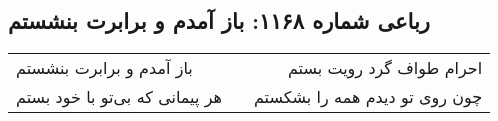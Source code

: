 \begin{center}
\section*{رباعی شماره ۱۱۶۸: باز آمدم و برابرت بنشستم}
\label{sec:1168}
\begin{longtable}{l p{0.5cm} r}
باز آمدم و برابرت بنشستم
&&
احرام طواف گرد رویت بستم
\\
هر پیمانی که بی‌تو با خود بستم
&&
چون روی تو دیدم همه را بشکستم
\\
\end{longtable}
\end{center}
